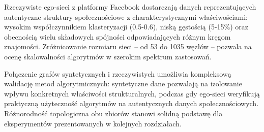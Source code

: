 Rzeczywiste ego-sieci z platformy Facebook dostarczają danych reprezentujących autentyczne struktury społecznościowe z charakterystycznymi właściwościami: wysokim współczynnikiem klasteryzacji (0.5-0.6), niską gęstością (5-15\%) oraz obecnością wielu składowych spójności odpowiadających różnym kręgom znajomości. Zróżnicowanie rozmiaru sieci -- od 53 do 1035 węzłów -- pozwala na ocenę skalowalności algorytmów w szerokim spektrum zastosowań.

Połączenie grafów syntetycznych i rzeczywistych umożliwia kompleksową walidację metod algorytmicznych: syntetyczne dane pozwalają na izolowanie wpływu konkretnych właściwości strukturalnych, podczas gdy ego-sieci weryfikują praktyczną użyteczność algorytmów na autentycznych danych społecznościowych. Różnorodność topologiczna obu zbiorów stanowi solidną podstawę dla eksperymentów prezentowanych w kolejnych rozdziałach.
